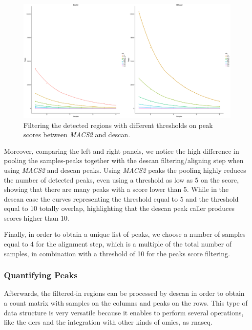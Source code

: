 \begin{figure}[H]
\centering
\includegraphics[width=\textwidth, keepaspectratio]{img/descan2/filtering_m2_d2.png}
\caption[DEScan2 and \textit{MACS2} filtering comparison]{Filtering the detected regions with different thresholds on peak scores between \textit{MACS2} and \gls{descan}.}
\label{fig:filteringdescanmacs2}

\end{figure}


Moreover, comparing the left and right panels, we notice the high difference in pooling the samples-peaks together with the \gls{descan} filtering/aligning step when using \textit{MACS2} and \gls{descan} peaks.
Using \textit{MACS2} peaks the pooling highly reduces the number of detected peaks, even using a threshold as low as 5 on the score, showing that there are many peaks with a score lower than 5.
While in the \gls{descan} case the curves representing the threshold equal to 5 and the threshold equal to 10 totally overlap, highlighting that the \gls{descan} peak caller produces scores higher than 10.

Finally, in order to obtain a unique list of peaks, we choose a number of samples equal to 4 for the alignment step, which is a multiple of the total number of samples, in combination with a threshold of 10 for the peaks score filtering.



\subsubsection{Quantifying Peaks}

Afterwards, the filtered-in regions can be processed by \gls{descan} in order to obtain a count matrix with samples on the columns and peaks on the rows.
This type of data structure is very versatile because it enables to perform several operations, like the \glspl{der} and the integration with other kinds of omics, as \gls{rnaseq}.

